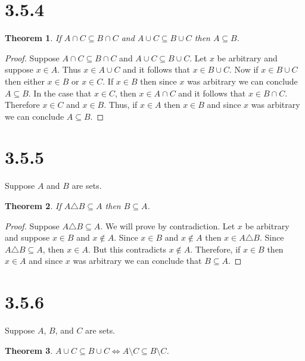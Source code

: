 \documentclass{article}
\newtheorem*{theorem}{Theorem}  %
\begin{document}
\section*{3.5.4}
\begin{theorem} If $A \cap C \subseteq B \cap C$ and $A \cup C \subseteq B \cup C$ then $A \subseteq B$.
\end{theorem}

\begin{proof}
Suppose $A \cap C \subseteq B \cap C$ and $A \cup C \subseteq B \cup C$. Let $x$ be arbitrary and suppose $x \in A$. Thus $x \in A \cup C$ and it follows that $x \in B \cup C$. Now if $x \in B \cup C$ then either  $x \in B$ or $x \in C$. If $x \in B$ then since $x$ was arbitrary we can conclude $A \subseteq B$. In the case that $x \in C$, then $x \in A \cap C$ and it follows that $x \in B \cap C$. Therefore $x \in C$ and $x \in B$. Thus, if $x \in A$ then $x \in B$ and since $x$ was arbitrary we can conclude $A \subseteq B$. 
\end{proof}

\section*{3.5.5}
Suppose $A$ and $B$ are sets.

\begin{theorem} If $A \triangle B \subseteq A$ then $B \subseteq A$.
\end{theorem}

\begin{proof}
Suppose $A \triangle B \subseteq A$. We will prove by contradiction. Let $x$ be arbitrary and suppose $x \in B$ and $x \notin A$. Since $x \in B$ and $x \notin A$ then $x \in A \triangle B$. Since $A \triangle B \subseteq A$, then $x \in A$. But this contradicts $x \notin A$. Therefore, if $x \in B$ then $x \in A$ and since $x$ was arbitrary we can conclude that $B \subseteq A$.
\end{proof}


\section*{3.5.6}
Suppose $A$, $B$, and $C$ are sets.
\begin{theorem} $A \cup C \subseteq B \cup C \iff A \setminus C \subseteq B \setminus C$.
\end{theorem}
\end{document}
